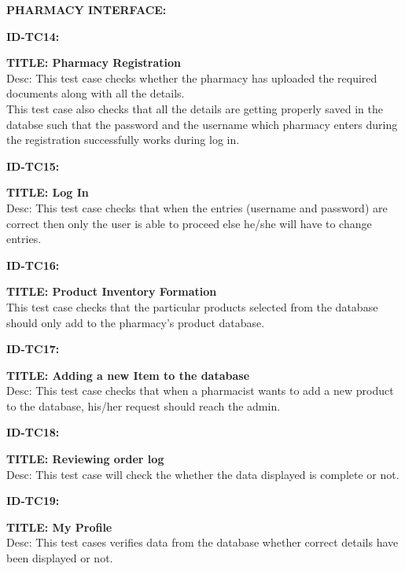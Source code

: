 \documentclass{article}
\begin{document}
\item \textbf{PHARMACY INTERFACE:}

\item \textbf{ID-TC14:}
\item \textbf{TITLE: Pharmacy Registration}\\
Desc: This test case checks whether the pharmacy has uploaded the required documents along with all the details.\\
This test case also checks that all the details are getting properly saved in the databse such that the password and the username which pharmacy enters during the registration successfully works during log in.\\

\item \textbf{ID-TC15:}
\item \textbf{TITLE: Log In}\\
Desc: This test case checks that when the entries (username and password) are correct then only the user is able to proceed else he/she will have to change entries.\\

\item \textbf{ID-TC16:}
\item \textbf{TITLE: Product Inventory Formation}\\
This test case checks that the particular products selected from the database should only add to the pharmacy’s product database.\\

\item \textbf{ID-TC17:}
\item \textbf{TITLE: Adding a new Item to the database}\\
Desc: This test case checks that when a pharmacist wants to add a new product to the database, his/her request should reach the admin.\\

\item \textbf{ID-TC18:}
\item \textbf{TITLE: Reviewing order log}\\
Desc:  This test case will check the whether the data displayed is complete or not.\\

\item \textbf{ID-TC19:}
\item \textbf{TITLE: My Profile}\\
Desc: This test cases verifies data from the database whether correct details have been displayed or not.\\
\end{document}
